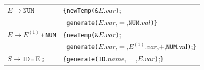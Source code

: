 \documentclass[dvipdfmx]{jarticle}
\begin{document}
\begin{tabular}{ll}
  $E\rightarrow\texttt{NUM}$ & \texttt{\{newTemp(\&}$E.var$\texttt{)};\\
  & \ \texttt{generate(}$E.var$,$=$,$\texttt{NUM}.val$\texttt{)\}}\\
  $E\rightarrow E^{(1)}$\,\texttt{+}\,\texttt{NUM}
  & \texttt{\{newTemp(\&}$E.var$\texttt{)};\\
  & \ \texttt{generate(}$E.var$,$=$,$E^{(1)}.var$,$+$,\texttt{NUM}.val\texttt{)};\texttt{\}}\\
  $S\rightarrow\texttt{ID}$\,\texttt{=}\,E\,\texttt{;}
  & \texttt{\{generate(ID}$.name$,$=$,$E.var$\texttt{)};\texttt{\}}
\end{tabular}
\end{document}
